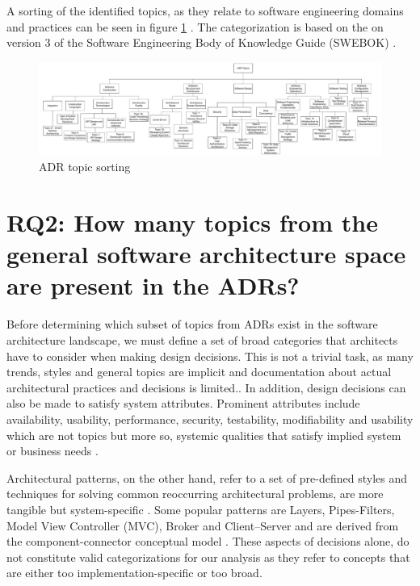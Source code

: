         A sorting of the identified topics, as they relate to software engineering domains and practices can be seen in figure \ref{fig:topic_tree_sort_RQ1} . The categorization is based on the  on version 3 of the Software Engineering Body of Knowledge Guide (SWEBOK) \cite{swebok_v3}.

        \begin{figure}
            \hspace*{-0.8cm} 
            \centering
            \includegraphics[scale=0.50]{figures/RQ1_sort_final.drawio.pdf}
            \caption{ADR topic sorting}
            \label{fig:topic_tree_sort_RQ1}
            \hspace*{-2cm} 
        \end{figure}

    \section{RQ2: How many topics from the general software architecture space are present in the ADRs?}

        Before determining which subset of topics from ADRs exist in the software architecture landscape, we must define a set of broad categories that architects have to consider when making design decisions. This is not a trivial task, as many trends, styles and general topics are implicit and documentation about actual architectural practices and decisions is limited.\cite{arch_patterns_in_practice_TOPICS}. In addition, design decisions can also be made to satisfy system attributes. Prominent attributes include availability, usability, performance, security, testability, modifiability and usability which are not topics but more so, systemic qualities that satisfy implied system or business needs \cite{patters+quality_requirements+tactics}.
        
        Architectural patterns, on the other hand, refer to a set of pre-defined styles and techniques for solving common reoccurring architectural problems, are more tangible but system-specific \cite{Patterns+ArchDecisions}. Some popular patterns are Layers, Pipes-Filters, Model View Controller (MVC), Broker and Client–Server and are derived from the component-connector conceptual model \cite{survey_arch_patterns}. These aspects of decisions alone, do not constitute valid categorizations for our analysis as they refer to concepts that are either too implementation-specific or too broad. 
        
